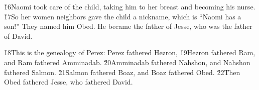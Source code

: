 \v{16}Naomi took care of the child, taking him to her breast and becoming his nurse. \v{17}So her women neighbors gave the child a nickname, which is ``Naomi has a son!'' They named him Obed. He became the father of Jesse, who was the father of David.

\v{18}This is the genealogy of Perez: Perez fathered Hezron, \v{19}Hezron fathered Ram, and Ram fathered Amminadab. \v{20}Amminadab fathered Nahshon, and Nahshon fathered Salmon. \v{21}Salmon fathered Boaz, and Boaz fathered Obed. \v{22}Then Obed fathered Jesse, who fathered David.
